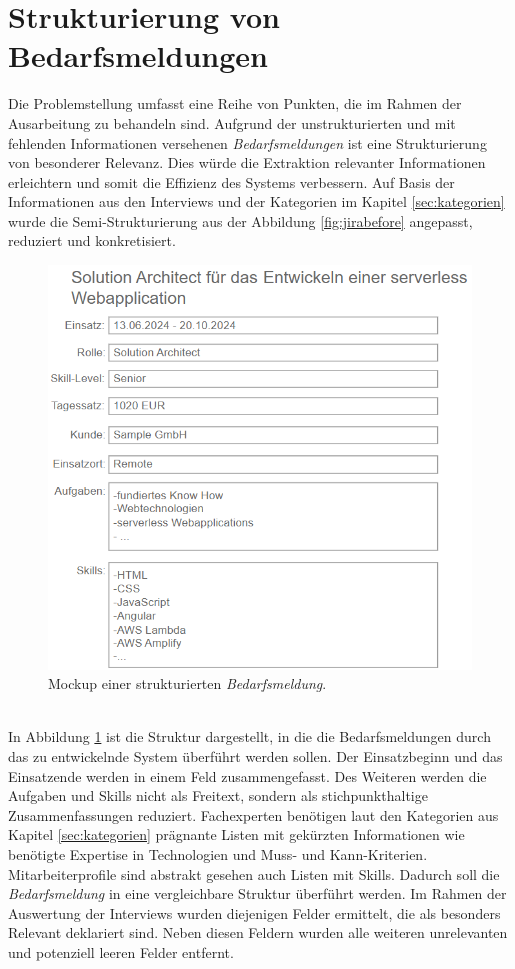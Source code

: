 \section{Strukturierung von Bedarfsmeldungen}
\label{sec:strukturierungbedarfsmeldung}
Die Problemstellung umfasst eine Reihe von Punkten, die im Rahmen der Ausarbeitung zu behandeln sind. Aufgrund der unstrukturierten und mit fehlenden Informationen versehenen \emph{Bedarfsmeldungen} ist eine Strukturierung von besonderer Relevanz. Dies würde die Extraktion relevanter Informationen erleichtern und somit die Effizienz des Systems verbessern. Auf Basis der Informationen aus den Interviews und der Kategorien im Kapitel \ref{sec:kategorien} wurde die Semi-Strukturierung aus der Abbildung \ref{fig:jirabefore} angepasst, reduziert und konkretisiert.
\begin{figure}[H]%
	\centering  
	\includegraphics[scale=1]{Abbildungen/jiraAfter.png}
	\caption{Mockup einer strukturierten \emph{Bedarfsmeldung}.}
	\label{fig:jiraafter}
\end{figure}\mbox{} \\
In Abbildung \ref{fig:jiraafter} ist die Struktur dargestellt, in die die Bedarfsmeldungen durch das zu entwickelnde System überführt werden sollen. Der Einsatzbeginn und das Einsatzende werden in einem Feld zusammengefasst. Des Weiteren werden die Aufgaben und Skills nicht als Freitext, sondern als stichpunkthaltige Zusammenfassungen reduziert. Fachexperten benötigen laut den Kategorien aus Kapitel \ref{sec:kategorien} prägnante Listen mit gekürzten Informationen wie benötigte Expertise in Technologien und Muss- und Kann-Kriterien. Mitarbeiterprofile sind abstrakt gesehen auch Listen mit Skills. Dadurch soll die \emph{Bedarfsmeldung} in eine vergleichbare Struktur überführt werden. Im Rahmen der Auswertung der Interviews wurden diejenigen Felder ermittelt, die als besonders Relevant deklariert sind. Neben diesen Feldern wurden alle weiteren unrelevanten und potenziell leeren Felder entfernt.\\

